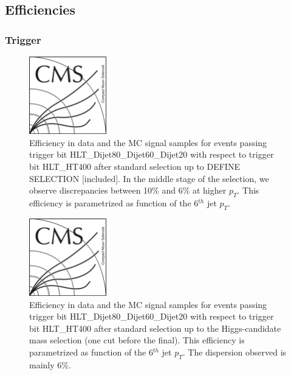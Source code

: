
\subsection{Efficiencies}
\label{sec:eff}

\subsubsection{Trigger}
\label{sec:trigger}

\begin{figure}[!Hhtbp]
  \begin{center}
    \includegraphics[width=0.3\textwidth]{figs/CMSlogo.png}
    \caption{Efficiency in data and the MC signal samples for events passing trigger bit HLT\_Dijet80\_Dijet60\_Dijet20 with respect to trigger bit HLT\_HT400 after standard selection up to DEFINE SELECTION [included]. In the middle stage of the selection, we observe discrepancies between 10\% and 6\% at higher $p_{T}$. This efficiency is parametrized as function of the 6$^{th}$ jet $p_{T}$.}
    \label{fig:TrigEff}
  \end{center}
\end{figure}\clearpage

\begin{figure}[!Hhtbp]
  \begin{center}
    \includegraphics[width=0.3\textwidth]{figs/CMSlogo.png}
    \caption{Efficiency in data and the MC signal samples for events passing trigger bit HLT\_Dijet80\_Dijet60\_Dijet20 with respect to trigger bit HLT\_HT400 after standard selection up to the Higgs-candidate mass selection (one cut before the final). This efficiency is parametrized as function of the 6$^{th}$ jet $p_{T}$. The dispersion observed is mainly 6\%.}
    \label{fig:TrigEffPostDalitz}
  \end{center}
\end{figure}\clearpage

